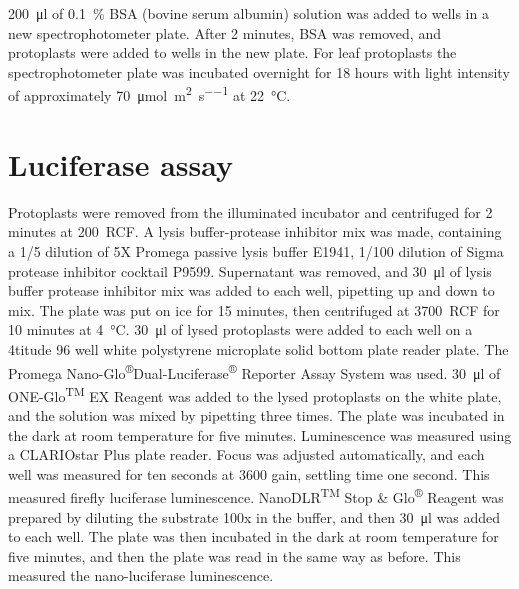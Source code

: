 \documentclass[../main.tex]{subfiles}
\begin{document}
\SI{200}{\micro\litre} of \SI{0.1}{\percent} BSA (bovine serum albumin) solution was added to wells in a new spectrophotometer plate.
After 2 minutes, BSA was removed, and protoplasts were added to wells in the new plate.
For leaf protoplasts the spectrophotometer plate was incubated overnight for 18 hours with light intensity of approximately \SI{70}{\umol\per\square\meter\per\s} at \SI{22}{\degreeCelsius}.

\section{Luciferase assay}\label{chapter2:methods:luciferase-assay}

Protoplasts were removed from the illuminated incubator and centrifuged for 2 minutes at 200~RCF.
A lysis buffer\hyp{}protease inhibitor mix was made, containing a 1/5 dilution of 5X Promega passive lysis buffer E1941, 1/100 dilution of Sigma protease inhibitor cocktail P9599.
Supernatant was removed, and \SI{30}{\micro\litre} of lysis buffer protease inhibitor mix was added to each well, pipetting up and down to mix.
The plate was put on ice for 15 minutes, then centrifuged at 3700~RCF for 10 minutes at \SI{4}{\degreeCelsius}.
\SI{30}{\micro\litre} of lysed protoplasts were added to each well on a 4titude 96 well white polystyrene microplate solid bottom plate reader plate. 
The Promega Nano\hyp{}Glo\textsuperscript{®}Dual\hyp{}Luciferase\textsuperscript{®} Reporter Assay System was used.
\SI{30}{\micro\litre} of ONE\hyp{}Glo\textsuperscript{TM} EX Reagent was added to the lysed protoplasts on the white plate, and the solution was mixed by pipetting three times.
The plate was incubated in the dark at room temperature for five minutes. Luminescence was measured using a CLARIOstar Plus plate reader.
Focus was adjusted automatically, and each well was measured for ten seconds at 3600 gain, settling time one second.
This measured firefly luciferase luminescence.
NanoDLR\textsuperscript{TM} Stop \& Glo\textsuperscript{®} Reagent was prepared by diluting the substrate 100x in the buffer, and then \SI{30}{\micro\litre} was added to each well.
The plate was then incubated in the dark at room temperature for five minutes, and then the plate was read in the same way as before.
This measured the nano\hyp{}luciferase luminescence.
\end{document}
